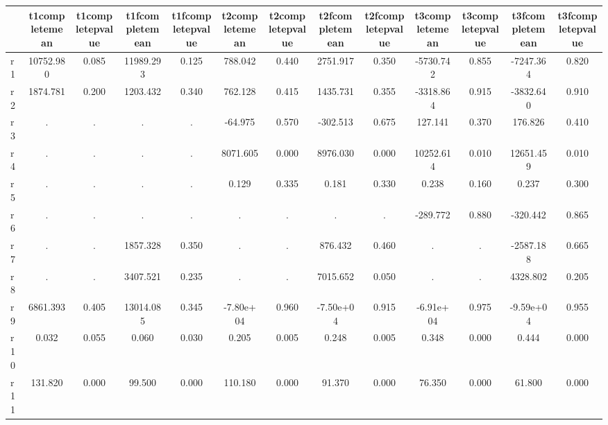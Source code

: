 \begin{table}[htbp]
\begin{tabular}{lcccccccccccc} \hline \hline
 & t1completemean  & t1completepvalue  & t1fcompletemean  & t1fcompletepvalue  & t2completemean  & t2completepvalue  & t2fcompletemean  & t2fcompletepvalue  & t3completemean  & t3completepvalue  & t3fcompletemean  & t3fcompletepvalue  \\  \hline 
r1 & 10752.980 &     0.085 & 11989.293 &     0.125 &   788.042 &     0.440 &  2751.917 &     0.350 & -5730.742 &     0.855 & -7247.364 &     0.820 \\  
r2 &  1874.781 &     0.200 &  1203.432 &     0.340 &   762.128 &     0.415 &  1435.731 &     0.355 & -3318.864 &     0.915 & -3832.640 &     0.910 \\  
r3 &         . &         . &         . &         . &   -64.975 &     0.570 &  -302.513 &     0.675 &   127.141 &     0.370 &   176.826 &     0.410 \\  
r4 &         . &         . &         . &         . &  8071.605 &     0.000 &  8976.030 &     0.000 & 10252.614 &     0.010 & 12651.459 &     0.010 \\  
r5 &         . &         . &         . &         . &     0.129 &     0.335 &     0.181 &     0.330 &     0.238 &     0.160 &     0.237 &     0.300 \\  
r6 &         . &         . &         . &         . &         . &         . &         . &         . &  -289.772 &     0.880 &  -320.442 &     0.865 \\  
r7 &         . &         . &  1857.328 &     0.350 &         . &         . &   876.432 &     0.460 &         . &         . & -2587.188 &     0.665 \\  
r8 &         . &         . &  3407.521 &     0.235 &         . &         . &  7015.652 &     0.050 &         . &         . &  4328.802 &     0.205 \\  
r9 &  6861.393 &     0.405 & 13014.085 &     0.345 & -7.80e+04 &     0.960 & -7.50e+04 &     0.915 & -6.91e+04 &     0.975 & -9.59e+04 &     0.955 \\  
r10 &     0.032 &     0.055 &     0.060 &     0.030 &     0.205 &     0.005 &     0.248 &     0.005 &     0.348 &     0.000 &     0.444 &     0.000 \\  
r11 &   131.820 &     0.000 &    99.500 &     0.000 &   110.180 &     0.000 &    91.370 &     0.000 &    76.350 &     0.000 &    61.800 &     0.000 \\  
\hline \hline \end{tabular}
\end{table}
